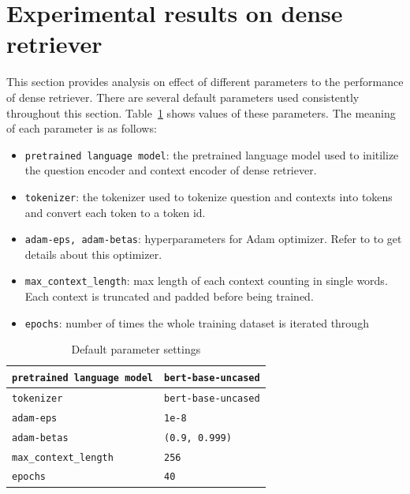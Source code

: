 \documentclass[12pt, sort&compress]{report}
\begin{document}
\section{Experimental results on dense retriever}
\label{sec:4.4}
This section provides analysis on effect of different parameters to the performance of dense retriever. There are several default parameters used consistently throughout this section. Table~\ref{tab:02} shows values of these parameters. The meaning of each parameter is as follows:
\begin{itemize}
	\item {\tt pretrained language model}: the pretrained language model used to initilize the question encoder and context encoder of dense retriever.
	\item {\tt tokenizer}: the tokenizer used to tokenize question and contexts into tokens and convert each token to a token id.
	\item {\tt adam-eps, adam-betas}: hyperparameters for Adam optimizer. Refer to \cite{kingma2014adam} to get details about this optimizer.
	\item {\tt max\_context\_length}: max length of each context counting in single words. Each context is truncated and padded before being trained.
	\item {\tt epochs}: number of times the whole training dataset is iterated through
\end{itemize}
\begin{table}[!htbp]
	\caption{Default parameter settings}
	\label{tab:02}
	\centering
	\begin{tabular}{p{.4\linewidth}p{.4\linewidth}}
		\hline
		{\tt pretrained language model}  & {\tt bert-base-uncased} \\\hline
		{\tt tokenizer} & {\tt bert-base-uncased} \\\hline
		{\tt adam-eps} & {\tt1e-8} \\\hline
		{\tt adam-betas} & {\tt (0.9, 0.999)} \\\hline
		{\tt max\_context\_length} & {\tt 256} \\\hline
		{\tt epochs} & {\tt 40} \\\hline
	\end{tabular}
\end{table}
\end{document}

